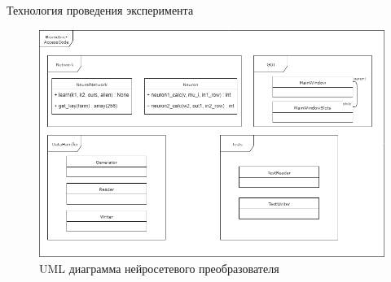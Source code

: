 \begin{frame}{Технология проведения эксперимента}
	\begin{figure}
        \includegraphics[width=\textwidth]{img/CourseWork.png}
        \caption{UML диаграмма нейросетевого преобразователя}
    \end{figure}
\end{frame}
